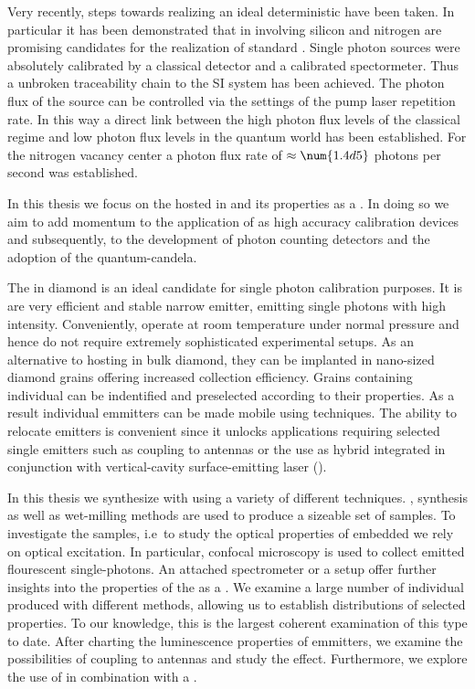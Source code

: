 	Very recently, steps towards realizing an ideal deterministic \sps have been taken. In particular it has been demonstrated that \ccs in \nds involving silicon \cite{Rodiek2017::12, Rodiek2017::13} and nitrogen \cite{Rodiek2017::8} are promising candidates for the realization of standard \spss \cite{Rodiek2017,Vaigu2017}. Single photon sources were absolutely calibrated by a classical detector and a calibrated spectormeter. Thus a unbroken traceability chain to the SI system has been achieved. The photon flux of the source can be controlled via the settings of the pump laser repetition rate. In this way a direct link between the high photon flux levels of the classical regime and low photon flux levels in the quantum world has been established. For the nitrogen vacancy center a photon flux rate of $\approx \num{1.4d5}$ photons per second was established.

	In this thesis we focus on the \sivc hosted in \nd and its properties as a \sps. In doing so we aim to add momentum to the application of \sps as high accuracy calibration devices and subsequently, to the development of photon counting detectors and the adoption of the quantum-candela.

	The \siv in diamond is an ideal candidate for single photon calibration purposes. It is are very efficient and stable narrow \lw emitter, emitting single photons with high intensity. Conveniently, \sivs operate at room temperature under normal pressure and hence do not require extremely sophisticated experimental setups. As an alternative to hosting \sivs in bulk diamond, they can be implanted in nano-sized diamond grains offering increased collection efficiency. Grains containing individual \sivs can be indentified and preselected according to their properties. As a result individual emmitters can be made mobile using \pp techniques. The ability to relocate emitters is convenient since it unlocks applications requiring selected single emitters such as coupling to antennas or the use as hybrid integrated \spss in conjunction with vertical-cavity surface-emitting laser (\VCSEL).

	In this thesis we synthesize \nds with \sivs using a variety of different techniques. \Cvd, \hpht synthesis as well as wet-milling methods are used to produce a sizeable set of samples. To investigate the samples, i.e\ to study the optical properties of embedded \sivs we rely on optical excitation. In particular, confocal microscopy is used to collect emitted flourescent single-photons. An attached spectrometer or a \HBT setup offer further insights into the properties of the \siv as a \sps. We examine a large number of individual \sivs produced with different methods, allowing us to establish distributions of selected \siv properties. To our knowledge, this is the largest coherent examination of this type to date. After charting the luminescence properties of emmitters, we examine the possibilities of coupling \sivs to antennas and study the effect. Furthermore, we explore the use of \sivs in combination with a \VCSEL.

